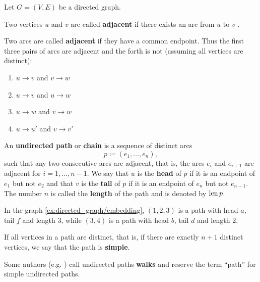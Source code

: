 \begin{definition}\label{def:graph_paths}
  Let \( G = (V, E) \) be a directed graph.

  \begin{defenum}
     Two vertices \( u \)  and \( v \)  are called \textbf{adjacent} if there exists an arc from \( u \)  to \( v \) .

    \cite[chapter 1, section 1.4]{Gondran1984} Two arcs are called \textbf{adjacent} if they have a common endpoint. Thus the first three pairs of arcs are adjacent and the forth is not (assuming all vertices are distinct):
    \begin{enumerate}
      \item \( u \to v \) and \( v \to w \)
      \item \( u \to v \) and \( u \to w \)
      \item \( u \to w \) and \( v \to w \)
      \item \( u \to u' \) and \( v \to v' \)
    \end{enumerate}

    \cite[chapter 1, section 3.1]{Gondran1984} An \textbf{undirected path} or \textbf{chain} is a sequence of distinct arcs
    \begin{equation*}
      p \coloneqq ( e_1, \ldots, e_n ),
    \end{equation*}
    such that any two consecutive arcs are adjacent, that is, the arcs \( e_i \) and \( e_{i+1} \) are adjacent for \( i = 1, \ldots, n - 1 \). We say that \( u \) is the \textbf{head} of \( p \) if it is an endpoint of \( e_1 \) but not \( e_2 \) and that \( v \) is the \textbf{tail} of \( p \) if it is an endpoint of \( e_n \) but not \( e_{n-1} \). The number $n$ is called the \textbf{length} of the path and is denoted by \( \operatorname{len} p \).

    In the graph \cref{ex:directed_graph/embedding}, \( (1, 2, 3) \) is a path with head \( a \), tail \( f \) and length 3, while \( (3, 4) \) is a path with head \( b \), tail \( d \) and length 2.

    If all vertices in a path are distinct, that is, if there are exactly $n + 1$ distinct vertices, we say that the path is \textbf{simple}.

    Some authors (e.g. \cite[section 5.2]{Erickson2019}) call undirected paths \textbf{walks} and reserve the term \enquote{path} for simple undirected paths.


\end{defenum}
\end{definition}
